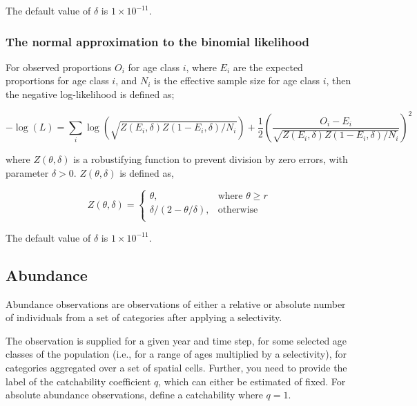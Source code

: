 The default value of $\delta$ is $1 \times 10^{-11}$.

\subsubsection*{The normal approximation to the binomial likelihood}

For observed proportions $O_i$ for age class $i$, where $E_i$ are the expected proportions for age class $i$, and $N_i$ is the effective sample size for age class $i$, then the negative log-likelihood is defined as;  

\begin{equation}
  -\log \left(L \right)= \sum\limits_i \log \left( \sqrt{Z\left(E_i,\delta \right)Z\left(1-E_i,\delta\right)/N_i} \right)     + \frac{1}{2} \left( \frac{O_i-E_i}{\sqrt{Z\left(E_i,\delta\right)Z\left(1-E_i,\delta \right)/N_i}} \right)^2
\end{equation}

where $Z \left(\theta,\delta \right)$ is a robustifying function to prevent division by zero errors, with parameter $\delta>0$. $Z \left(\theta,\delta \right)$ is defined as,

\begin{equation}
   Z \left(\theta,\delta \right) = \begin{cases}
	  \theta, & \text{where $\theta \ge r$} \\
	  \delta/\left( 2-\theta/\delta \right), & \text{otherwise} \\  
  \end{cases}
\end{equation}

The default value of $\delta$ is $1 \times 10^{-11}$.

\subsection{Abundance}

Abundance observations are observations of either a relative or absolute number of individuals from a set of categories after applying a selectivity. 

The observation is supplied for a given year and time step, for some selected age classes of the population (i.e., for a range of ages multiplied by a selectivity), for categories aggregated over a set of spatial cells. Further, you need to provide the label of the catchability coefficient $q$, which can either be estimated of fixed. For absolute abundance observations, define a catchability where $q=1$.

